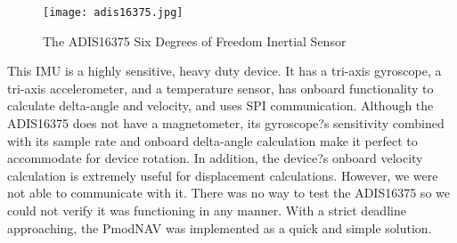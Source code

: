 \begin{figure}[H]
	\centerline{\texttt{[image: adis16375.jpg]}}
	\caption{The ADIS16375 Six Degrees of Freedom Inertial Sensor \cite{adisBreakout}}
	\label{adis16375}
\end{figure}

This IMU is a highly sensitive, heavy duty device. It has a tri-axis gyroscope, a tri-axis accelerometer, and a temperature sensor, has onboard functionality to calculate delta-angle and velocity, and uses SPI communication. Although the ADIS16375 does not have a magnetometer, its gyroscope?s sensitivity combined with its sample rate and onboard delta-angle calculation make it perfect to accommodate for device rotation. In addition, the device?s onboard velocity calculation is extremely useful for displacement calculations. However, we were not able to communicate with it. There was no way to test the ADIS16375 so we could not verify it was functioning in any manner. With a strict deadline approaching, the PmodNAV was implemented as a quick and simple solution.




